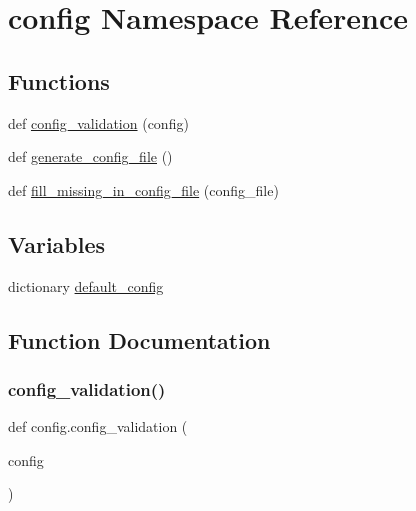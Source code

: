 \hypertarget{namespaceconfig}{}\section{config Namespace Reference}
\label{namespaceconfig}
\subsection*{Functions}
\begin{DoxyCompactItemize}
\item 
def \hyperlink{namespaceconfig_a4097152d333d323cef0159878ff205fc}{config\+\_\+validation} (config)
\item 
def \hyperlink{namespaceconfig_a8e5e09166a67c11eb868143f4e85607f}{generate\+\_\+config\+\_\+file} ()
\item 
def \hyperlink{namespaceconfig_ac7ad14f68cd9aec9e9b9d3cf08b3db07}{fill\+\_\+missing\+\_\+in\+\_\+config\+\_\+file} (config\+\_\+file)
\end{DoxyCompactItemize}
\subsection*{Variables}
\begin{DoxyCompactItemize}
\item 
dictionary \hyperlink{namespaceconfig_ac321195dcb6ced179a85db093e63a1c9}{default\+\_\+config}
\end{DoxyCompactItemize}


\subsection{Function Documentation}
\mbox{\label{namespaceconfig_a4097152d333d323cef0159878ff205fc}} 
\subsubsection{\texorpdfstring{config\+\_\+validation()}{config\_validation()}}
{\footnotesize\ttfamily def config.\+config\+\_\+validation (\begin{DoxyParamCaption}\item[{}]{config }\end{DoxyParamCaption})}

\mbox{\label{namespaceconfig_ac7ad14f68cd9aec9e9b9d3cf08b3db07}} 
